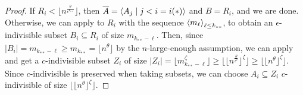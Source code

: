 \begin{theorem}[Theorem 4.23]
\begin{proof}
            If $R_i < \lfloor n^{\frac{\theta}{\epsilon^{k_{**}}}} \rfloor$, then
            $\overline{A} = \left< A_j \mid j < i = i(*) \right>$ and $B = R_i$, and we are done.
            Otherwise, we can apply  to $R_i$ with the sequence
            $\left< m_\ell \right>_{\ell \leq k_{**}}$, to obtain an $\epsilon$-indivisible subset $B_i \subseteq R_i$ of
            size $m_{k_{**}-\ell}$.
            Then, since $|B_i| = m_{k_{**}-\ell} \geq m_{k_{**}} = \lfloor n^\theta \rfloor$ by the $n$-large-enough assumption,
            we can apply  and get a
            $c$-indivisible subset $Z_i$ of size $|Z_i| = \lfloor m_{k_{**}-\ell}^\zeta \rfloor
            \geq \lfloor \lfloor n^{\frac{\theta}{\epsilon^\ell}} \rfloor ^\zeta \rfloor
            \geq \lfloor \lfloor n^{\theta} \rfloor ^\zeta \rfloor$.
            Since $c$-indivisible is preserved when taking subsets,
            we can choose $A_i \subseteq Z_i$ $c$-indivisible of size $\lfloor \lfloor n^{\theta} \rfloor ^\zeta \rfloor$.
        \end{proof}
    \end{theorem}


